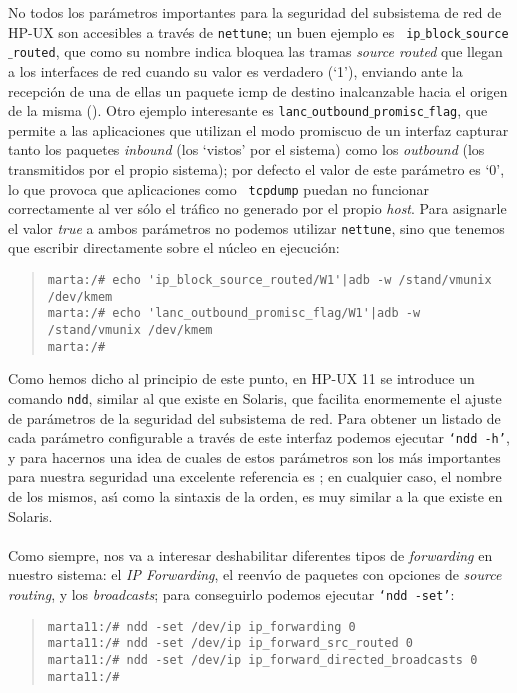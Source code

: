 No todos los par\'ametros importantes para la seguridad del subsistema de red
de HP-UX son accesibles a trav\'es de {\tt nettune}; un buen ejemplo es {\tt
ip$\_$block$\_$source$\_$routed}, que como su nombre indica bloquea las tramas
{\it source routed} que llegan a los interfaces de red cuando su valor es 
verdadero (`1'), enviando ante la recepci\'on de una de ellas un paquete {\sc
icmp} de destino inalcanzable hacia el origen de la misma (\cite{kn:ste98b}). 
Otro ejemplo interesante es {\tt lanc$\_$outbound$\_$promisc$\_$flag}, que
permite a las aplicaciones que utilizan el modo promiscuo de un interfaz 
capturar tanto los paquetes {\it inbound} (los `vistos' por el sistema) como 
los {\it outbound} (los transmitidos por el propio sistema); por defecto el
valor de este par\'ametro es `0', lo que provoca que aplicaciones como {\tt
tcpdump} puedan no funcionar correctamente al ver s\'olo el tr\'afico no 
generado por el propio {\it host}. Para asignarle el valor {\it true} a ambos
par\'ametros no podemos utilizar {\tt nettune}, sino que tenemos que escribir
directamente sobre el n\'ucleo en ejecuci\'on:
\begin{quote}
\begin{verbatim}
marta:/# echo 'ip_block_source_routed/W1'|adb -w /stand/vmunix /dev/kmem
marta:/# echo 'lanc_outbound_promisc_flag/W1'|adb -w /stand/vmunix /dev/kmem
marta:/#
\end{verbatim}
\end{quote}
Como hemos dicho al principio de este punto, en HP-UX 11 se introduce un comando
{\tt ndd}, similar al que existe en Solaris, que facilita enormemente el ajuste 
de par\'ametros de la seguridad del subsistema de red. Para obtener un listado
de cada par\'ametro configurable a trav\'es de este interfaz podemos ejecutar
{\tt `ndd -h'}, y para hacernos una idea de cuales de estos par\'ametros son
los m\'as importantes para nuestra seguridad una excelente referencia es 
\cite{kn:ste00}; en cualquier caso, el nombre de los mismos, as\'{\i} como la
sintaxis de la orden, es muy similar a la que existe en Solaris.\\
\\Como siempre, nos va a interesar deshabilitar diferentes tipos de {\it 
forwarding} en nuestro sistema: el {\it IP Forwarding}, el reenv\'{\i}o de 
paquetes con opciones de {\it source routing}, y los {\it broadcasts}; para 
conseguirlo podemos ejecutar {\tt `ndd -set'}:
\begin{quote}
\begin{verbatim}
marta11:/# ndd -set /dev/ip ip_forwarding 0
marta11:/# ndd -set /dev/ip ip_forward_src_routed 0
marta11:/# ndd -set /dev/ip ip_forward_directed_broadcasts 0
marta11:/# 
\end{verbatim}
\end{quote}
